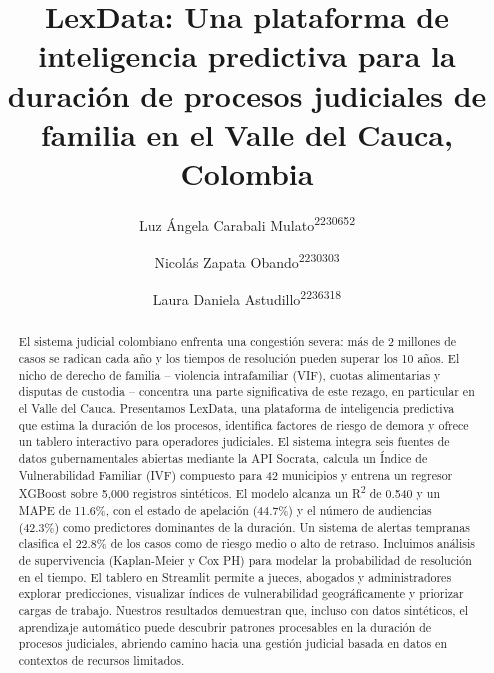 \documentclass[runningheads]{llncs}
\begin{document}
%
\title{LexData: Una plataforma de inteligencia predictiva para la duraci\'{o}n de procesos judiciales de familia en el Valle del Cauca, Colombia}
%
%
\author{Luz \'{A}ngela Carabali Mulato\textsuperscript{2230652}\and
Nicol\'{a}s Zapata Obando\textsuperscript{2230303}\and
Laura Daniela Astudillo\textsuperscript{2236318}}
%
%
%
\maketitle

\begin{abstract}
El sistema judicial colombiano enfrenta una congesti\'{o}n severa: m\'{a}s de 2 millones de casos se radican cada a\~{n}o y los tiempos de resoluci\'{o}n pueden superar los 10 a\~{n}os. El nicho de derecho de familia -- violencia intrafamiliar (VIF), cuotas alimentarias y disputas de custodia -- concentra una parte significativa de este rezago, en particular en el Valle del Cauca. Presentamos LexData, una plataforma de inteligencia predictiva que estima la duraci\'{o}n de los procesos, identifica factores de riesgo de demora y ofrece un tablero interactivo para operadores judiciales. El sistema integra seis fuentes de datos gubernamentales abiertas mediante la API Socrata, calcula un \'Indice de Vulnerabilidad Familiar (IVF) compuesto para 42 municipios y entrena un regresor XGBoost sobre 5,000 registros sint\'{e}ticos. El modelo alcanza un R\textsuperscript{2} de 0.540 y un MAPE de 11.6\%, con el estado de apelaci\'{o}n (44.7\%) y el n\'{u}mero de audiencias (42.3\%) como predictores dominantes de la duraci\'{o}n. Un sistema de alertas tempranas clasifica el 22.8\% de los casos como de riesgo medio o alto de retraso. Incluimos an\'{a}lisis de supervivencia (Kaplan-Meier y Cox PH) para modelar la probabilidad de resoluci\'{o}n en el tiempo. El tablero en Streamlit permite a jueces, abogados y administradores explorar predicciones, visualizar \'indices de vulnerabilidad geogr\'{a}ficamente y priorizar cargas de trabajo. Nuestros resultados demuestran que, incluso con datos sint\'{e}ticos, el aprendizaje autom\'{a}tico puede descubrir patrones procesables en la duraci\'{o}n de procesos judiciales, abriendo camino hacia una gesti\'{o}n judicial basada en datos en contextos de recursos limitados.

\end{abstract}
\end{document}
